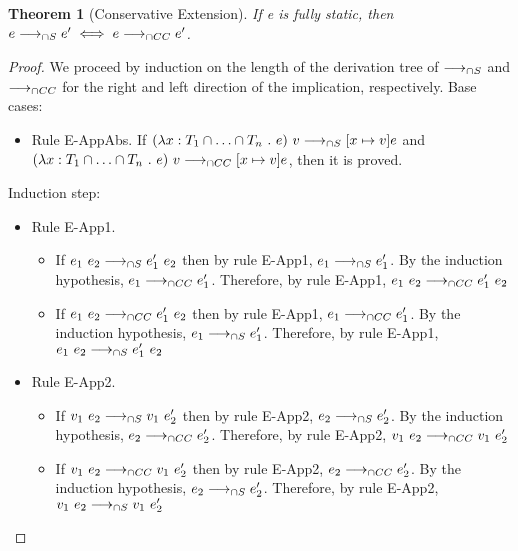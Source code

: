 \documentclass[a4paper]{article}
\newtheorem{theorem}{Theorem}[section]
\begin{document}
\begin{theorem}[Conservative Extension]
\label{conservative_extension_operational_semantics}
If e is fully static, then $e \longrightarrow_{\cap S} e' \iff e \longrightarrow_{\cap CC} e'$.
\end{theorem}
\begin{proof}
We proceed by induction on the length of the derivation tree of $\longrightarrow_{\cap S}$ and $\longrightarrow_{\cap CC}$ for the right and left direction of the implication, respectively.
Base cases:
\begin{itemize}
    \item Rule E-AppAbs.
    If $(\lambda x : T_1 \cap \ldots \cap T_n\ .\ e)\ v \longrightarrow_{\cap S} [x \mapsto v]e$ and $(\lambda x : T_1 \cap \ldots \cap T_n\ .\ e)\ v \longrightarrow_{\cap CC} [x \mapsto v]e$, then it is proved.
\end{itemize}
Induction step:
\begin{itemize}
    \item Rule E-App1.
    \begin{itemize}
        \item If $e_1\ e_2 \sios e_1'\ e_2$ then by rule E-App1, $e_1 \longrightarrow_{\cap S} e_1'$.
        By the induction hypothesis, $e_1 \longrightarrow_{\cap CC} e_1'$.
        Therefore, by rule E-App1, $e_1\ e_2 \gios e_1'\ e_2$
        \item If $e_1\ e_2 \gios e_1'\ e_2$ then by rule E-App1, $e_1 \longrightarrow_{\cap CC} e_1'$.
        By the induction hypothesis, $e_1 \longrightarrow_{\cap S} e_1'$.
        Therefore, by rule E-App1, $e_1\ e_2 \sios e_1'\ e_2$
    \end{itemize}
    \item Rule E-App2.
    \begin{itemize}
        \item If $v_1\ e_2 \sios v_1\ e_2'$ then by rule E-App2, $e_2 \longrightarrow_{\cap S} e_2'$.
        By the induction hypothesis, $e_2 \longrightarrow_{\cap CC} e_2'$.
        Therefore, by rule E-App2, $v_1\ e_2 \gios v_1\ e_2'$
        \item If $v_1\ e_2 \gios v_1\ e_2'$ then by rule E-App2, $e_2 \longrightarrow_{\cap CC} e_2'$.
        By the induction hypothesis, $e_2 \longrightarrow_{\cap S} e_2'$.
        Therefore, by rule E-App2, $v_1\ e_2 \sios v_1\ e_2'$
    \end{itemize}
\end{itemize}
\end{proof}
\end{document}
